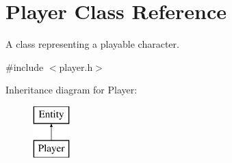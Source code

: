 \hypertarget{classPlayer}{}\section{Player Class Reference}
\label{classPlayer}


A class representing a playable character.  




{\ttfamily \#include $<$player.\+h$>$}

Inheritance diagram for Player\+:\begin{figure}[H]
\begin{center}
\leavevmode
\includegraphics[height=2.000000cm]{classPlayer}
\end{center}
\end{figure}
